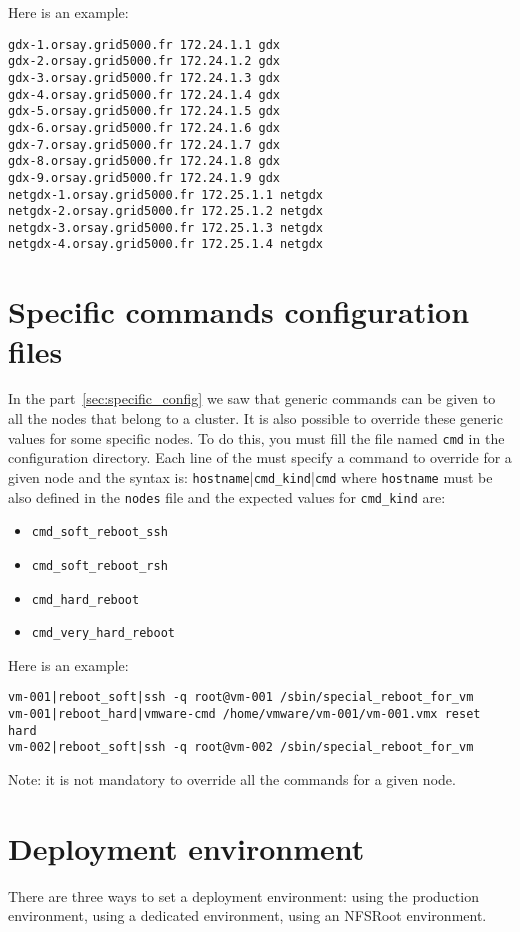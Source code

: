\documentclass[a4wide,10pt,oneside]{book}
\begin{document}
Here is an example:
\begin{small}
\begin{verbatim}
gdx-1.orsay.grid5000.fr 172.24.1.1 gdx
gdx-2.orsay.grid5000.fr 172.24.1.2 gdx
gdx-3.orsay.grid5000.fr 172.24.1.3 gdx
gdx-4.orsay.grid5000.fr 172.24.1.4 gdx
gdx-5.orsay.grid5000.fr 172.24.1.5 gdx
gdx-6.orsay.grid5000.fr 172.24.1.6 gdx
gdx-7.orsay.grid5000.fr 172.24.1.7 gdx
gdx-8.orsay.grid5000.fr 172.24.1.8 gdx
gdx-9.orsay.grid5000.fr 172.24.1.9 gdx
netgdx-1.orsay.grid5000.fr 172.25.1.1 netgdx
netgdx-2.orsay.grid5000.fr 172.25.1.2 netgdx
netgdx-3.orsay.grid5000.fr 172.25.1.3 netgdx
netgdx-4.orsay.grid5000.fr 172.25.1.4 netgdx
\end{verbatim}
\end{small}

\section{Specific commands configuration files}
In the part~\ref{sec:specific_config} we saw that generic commands can be given to all the nodes that belong to a cluster. It is also possible to override these generic values for some specific nodes. To do this, you must fill the file named \texttt{cmd} in the configuration directory. Each line of the must specify a command to override for a given node and the syntax is: \texttt{hostname}|\texttt{cmd\_kind}|\texttt{cmd} where \texttt{hostname} must be also defined in the \texttt{nodes} file and the expected values for \texttt{cmd\_kind} are:
\begin{itemize}
\item \texttt{cmd\_soft\_reboot\_ssh}
\item \texttt{cmd\_soft\_reboot\_rsh}
\item \texttt{cmd\_hard\_reboot}
\item \texttt{cmd\_very\_hard\_reboot}
\end{itemize}

Here is an example:
\begin{small}
\begin{verbatim}
vm-001|reboot_soft|ssh -q root@vm-001 /sbin/special_reboot_for_vm
vm-001|reboot_hard|vmware-cmd /home/vmware/vm-001/vm-001.vmx reset hard
vm-002|reboot_soft|ssh -q root@vm-002 /sbin/special_reboot_for_vm
\end{verbatim}
\end{small}
Note: it is not mandatory to override all the commands for a given node.


\section{Deployment environment}
There are three ways to set a deployment environment: using the production environment, using a dedicated environment, using an NFSRoot environment.
\end{document}
